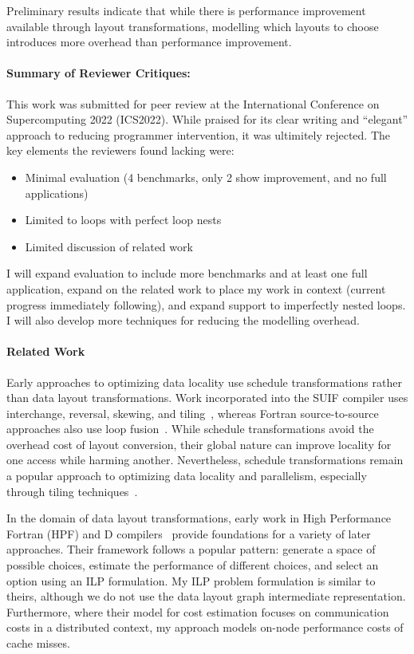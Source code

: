 \documentclass{article}
\begin{document}
Preliminary results indicate that while there is performance improvement available through layout transformations, modelling which layouts to choose introduces more overhead than performance improvement. 


\paragraph{Summary of Reviewer Critiques:}

This work was submitted for peer review at the International Conference on Supercomputing 2022 (ICS2022). 
While praised for its clear writing and \enquote{elegant} approach to reducing programmer intervention, it was ultimitely rejected.
The key elements the reviewers found lacking were:
\begin{itemize}
\item Minimal evaluation (4 benchmarks, only 2 show improvement, and no full applications)
\item Limited to loops with perfect loop nests
\item Limited discussion of related work
\end{itemize}
I will expand evaluation to include more benchmarks and at least one full application, expand on the related work to place my work in context (current progress immediately following), and expand support to imperfectly nested loops. I will also develop more techniques for reducing the modelling overhead.

\paragraph{Related Work}
Early approaches to optimizing data locality use schedule transformations rather than data layout transformations. 
Work incorporated into the SUIF compiler uses interchange, reversal, skewing, and tiling~\cite{wolf1991data}, whereas Fortran source-to-source approaches also use loop fusion~\cite{mckinley1996improving}.
While schedule transformations avoid the overhead cost of layout conversion, their global nature can improve locality for one access while harming another.
Nevertheless, schedule transformations remain a popular approach to optimizing data locality and parallelism, 
especially through tiling techniques~\cite{bondhugula2008pluto,bertolacci2015parameterized,bondhugula2016diamond,bandishti2012tiling,unat2016tida}.

In the domain of data layout transformations, early work in High Performance Fortran (HPF) and D compilers~\cite{bixby1994automatic,kennedy1995automatic,kennedy1998automatic} provide foundations for a variety of later approaches.
Their framework follows a popular pattern: generate a space of possible choices, estimate the performance of different choices, and select an option using an ILP formulation. 
My ILP problem formulation is similar to theirs, although we do not use the data layout graph intermediate representation.
Furthermore, where their model for cost estimation focuses on communication costs in a distributed context, my approach models on-node performance costs of cache misses.
\end{document}
